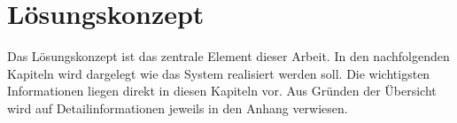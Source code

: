 \section{Lösungskonzept}
Das Lösungskonzept ist das zentrale Element dieser Arbeit. In den nachfolgenden Kapiteln wird dargelegt wie das System realisiert werden soll. Die wichtigsten Informationen liegen direkt in diesen Kapiteln vor. Aus Gründen der Übersicht wird auf Detailinformationen jeweils in den Anhang verwiesen.




\clearpage
\newpage

\newpage

\newpage

\newpage

\newpage

\newpage

\newpage

\newpage